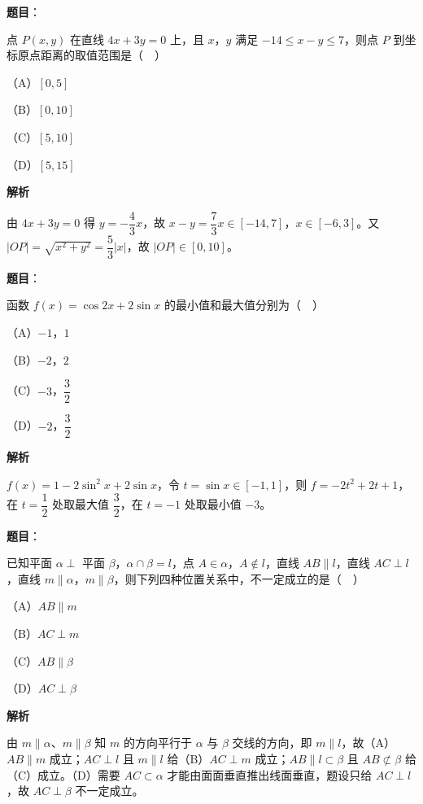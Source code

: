 \begin{answer}

\textbf{题目}：

点 $P(x,y)$ 在直线 $4x+3y=0$ 上，且 $x$，$y$ 满足 $-14\leqslant x-y\leqslant7$，则点 $P$ 到坐标原点距离的取值范围是（　）

（A）$[0,5]$

（B）$[0,10]$

（C）$[5,10]$

（D）$[5,15]$

\textbf{解析}

由 $4x+3y=0$ 得 $y=-\dfrac43x$，故 $x-y=\dfrac73x\in[-14,7]$，$x\in[-6,3]$。又 $|OP|=\sqrt{x^2+y^2}=\dfrac53|x|$，故 $|OP|\in[0,10]$。


\end{answer}
\begin{answer}

\textbf{题目}：

函数 $f(x)=\cos2x+2\sin x$ 的最小值和最大值分别为（　）

（A）$-1$，$1$

（B）$-2$，$2$

（C）$-3$，$\dfrac32$

（D）$-2$，$\dfrac32$

\textbf{解析}

$f(x)=1-2\sin^2x+2\sin x$，令 $t=\sin x\in[-1,1]$，则 $f=-2t^2+2t+1$，在 $t=\dfrac12$ 处取最大值 $\dfrac32$，在 $t=-1$ 处取最小值 $-3$。


\end{answer}
\begin{answer}

\textbf{题目}：

已知平面 $\alpha\perp$ 平面 $\beta$，$\alpha\cap\beta=l$，点 $A\in\alpha$，$A\notin l$，直线 $AB\parallel l$，直线 $AC\perp l$，直线 $m\parallel\alpha$，$m\parallel\beta$，则下列四种位置关系中，不一定成立的是（　）

（A）$AB\parallel m$

（B）$AC\perp m$

（C）$AB\parallel\beta$

（D）$AC\perp\beta$

\textbf{解析}

由 $m\parallel\alpha$、$m\parallel\beta$ 知 $m$ 的方向平行于 $\alpha$ 与 $\beta$ 交线的方向，即 $m\parallel l$，故（A）$AB\parallel m$ 成立；$AC\perp l$ 且 $m\parallel l$ 给（B）$AC\perp m$ 成立；$AB\parallel l\subset\beta$ 且 $AB\not\subset\beta$ 给（C）成立。（D）需要 $AC\subset\alpha$ 才能由面面垂直推出线面垂直，题设只给 $AC\perp l$，故 $AC\perp\beta$ 不一定成立。


\end{answer}
